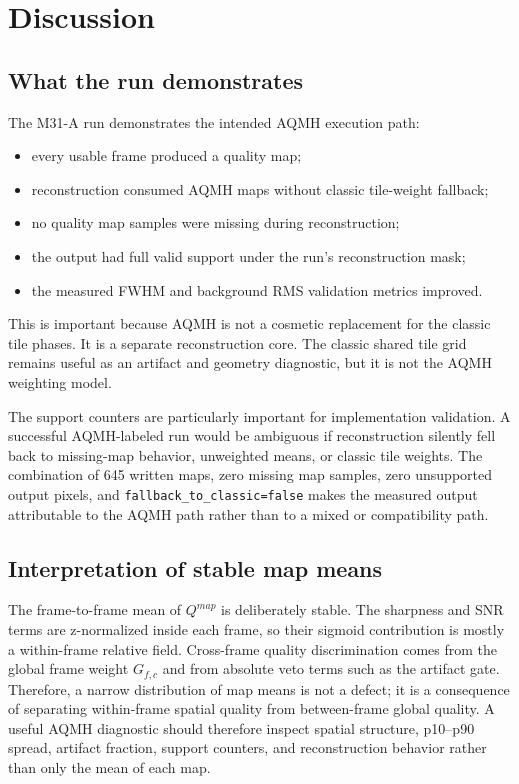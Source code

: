 \documentclass[10pt,twocolumn]{article}
\begin{document}
\section{Discussion}

\subsection{What the run demonstrates}

The M31-A run demonstrates the intended AQMH execution path:
\begin{itemize}
  \setlength{\itemsep}{0.05em}
  \setlength{\parsep}{0pt}
  \setlength{\parskip}{0pt}
  \setlength{\topsep}{0.15em}
  \item every usable frame produced a quality map;
  \item reconstruction consumed AQMH maps without classic tile-weight fallback;
  \item no quality map samples were missing during reconstruction;
  \item the output had full valid support under the run's reconstruction mask;
  \item the measured FWHM and background RMS validation metrics improved.
\end{itemize}
This is important because AQMH is not a cosmetic replacement for the classic tile phases. It is a
separate reconstruction core. The classic shared tile grid remains useful as an artifact and
geometry diagnostic, but it is not the AQMH weighting model.

The support counters are particularly important for implementation validation. A successful
AQMH-labeled run would be ambiguous if reconstruction silently fell back to missing-map behavior,
unweighted means, or classic tile weights. The combination of 645 written maps, zero missing map
samples, zero unsupported output pixels, and \texttt{fallback\_to\_classic=false} makes the
measured output attributable to the AQMH path rather than to a mixed or compatibility path.

\subsection{Interpretation of stable map means}

The frame-to-frame mean of $Q^{map}$ is deliberately stable. The sharpness and SNR terms are
z-normalized inside each frame, so their sigmoid contribution is mostly a within-frame relative
field. Cross-frame quality discrimination comes from the global frame weight $G_{f,c}$ and from
absolute veto terms such as the artifact gate. Therefore, a narrow distribution of map means is
not a defect; it is a consequence of separating within-frame spatial quality from between-frame
global quality. A useful AQMH diagnostic should therefore inspect spatial structure, p10--p90
spread, artifact fraction, support counters, and reconstruction behavior rather than only the
mean of each map.
\end{document}
